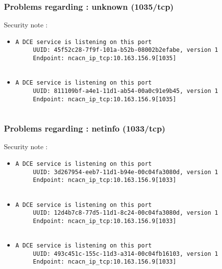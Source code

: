 \documentclass{article}
\begin{document}
\subsubsection{Problems regarding : unknown (1035/tcp)}
Security note :\\
\begin{itemize}
\item \begin{verbatim}
A DCE service is listening on this port
     UUID: 45f52c28-7f9f-101a-b52b-08002b2efabe, version 1
     Endpoint: ncacn_ip_tcp:10.163.156.9[1035]


\end{verbatim}\item \begin{verbatim}
A DCE service is listening on this port
     UUID: 811109bf-a4e1-11d1-ab54-00a0c91e9b45, version 1
     Endpoint: ncacn_ip_tcp:10.163.156.9[1035]


\end{verbatim}\end{itemize}
\subsubsection{Problems regarding : netinfo (1033/tcp)}
Security note :\\
\begin{itemize}
\item \begin{verbatim}
A DCE service is listening on this port
     UUID: 3d267954-eeb7-11d1-b94e-00c04fa3080d, version 1
     Endpoint: ncacn_ip_tcp:10.163.156.9[1033]


\end{verbatim}\item \begin{verbatim}
A DCE service is listening on this port
     UUID: 12d4b7c8-77d5-11d1-8c24-00c04fa3080d, version 1
     Endpoint: ncacn_ip_tcp:10.163.156.9[1033]


\end{verbatim}\item \begin{verbatim}
A DCE service is listening on this port
     UUID: 493c451c-155c-11d3-a314-00c04fb16103, version 1
     Endpoint: ncacn_ip_tcp:10.163.156.9[1033]


\end{verbatim}\end{itemize}
\end{document}
